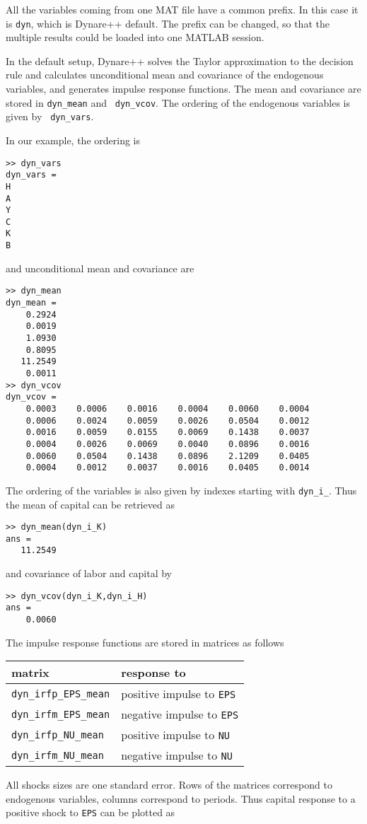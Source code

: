\documentclass[10pt]{article}
\begin{document}
All the variables coming from one MAT file have a common prefix. In
this case it is {\tt dyn}, which is Dynare++ default. The prefix can
be changed, so that the multiple results could be loaded into one MATLAB
session.

In the default setup, Dynare++ solves the Taylor approximation to the
decision rule and calculates unconditional mean and covariance of the
endogenous variables, and generates impulse response functions. The
mean and covariance are stored in {\tt dyn\_mean} and {\tt
dyn\_vcov}. The ordering of the endogenous variables is given by {\tt
dyn\_vars}.

In our example, the ordering is

{\small
\begin{verbatim}
>> dyn_vars
dyn_vars =
H
A
Y
C
K
B
\end{verbatim}
}

and unconditional mean and covariance are

{\small
\begin{verbatim}
>> dyn_mean
dyn_mean =
    0.2924
    0.0019
    1.0930
    0.8095
   11.2549
    0.0011
>> dyn_vcov
dyn_vcov =
    0.0003    0.0006    0.0016    0.0004    0.0060    0.0004
    0.0006    0.0024    0.0059    0.0026    0.0504    0.0012
    0.0016    0.0059    0.0155    0.0069    0.1438    0.0037
    0.0004    0.0026    0.0069    0.0040    0.0896    0.0016
    0.0060    0.0504    0.1438    0.0896    2.1209    0.0405
    0.0004    0.0012    0.0037    0.0016    0.0405    0.0014
\end{verbatim}
}

The ordering of the variables is also given by indexes starting with
{\tt dyn\_i\_}. Thus the mean of capital can be retrieved as

{\small
\begin{verbatim}
>> dyn_mean(dyn_i_K)
ans =
   11.2549
\end{verbatim}
}

\noindent and covariance of labor and capital by

{\small
\begin{verbatim}
>> dyn_vcov(dyn_i_K,dyn_i_H)
ans =
    0.0060
\end{verbatim}
}

The impulse response functions are stored in matrices as follows
\begin{center}
\begin{tabular}{|l|l|}
\hline
matrix& response to\\
\hline
{\tt dyn\_irfp\_EPS\_mean}& positive impulse to {\tt EPS}\\
{\tt dyn\_irfm\_EPS\_mean}& negative impulse to {\tt EPS}\\
{\tt dyn\_irfp\_NU\_mean}& positive impulse to {\tt NU}\\
{\tt dyn\_irfm\_NU\_mean}& negative impulse to {\tt NU}\\
\hline
\end{tabular}
\end{center}
All shocks sizes are one standard error. Rows of the matrices
correspond to endogenous variables, columns correspond to
periods. Thus capital response to a positive shock to {\tt EPS} can be
plotted as
\end{document}
